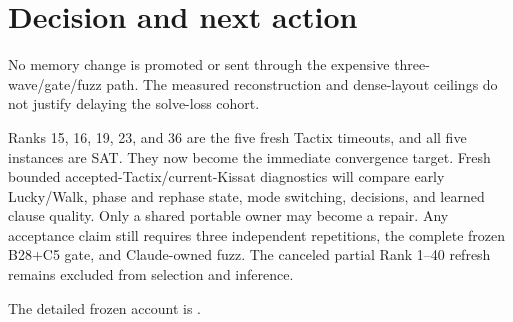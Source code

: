 \documentclass[11pt]{article}
\begin{document}
\section{Decision and next action}

No memory change is promoted or sent through the expensive three-wave/gate/fuzz
path.  The measured reconstruction and dense-layout ceilings do not justify
delaying the solve-loss cohort.

Ranks 15, 16, 19, 23, and 36 are the five fresh Tactix timeouts, and all five
instances are SAT.  They now become the immediate convergence target.  Fresh
bounded accepted-Tactix/current-Kissat diagnostics will compare early
Lucky/Walk, phase and rephase state, mode switching, decisions, and learned
clause quality.  Only a shared portable owner may become a repair.  Any
acceptance claim still requires three independent repetitions, the complete
frozen B28+C5 gate, and Claude-owned fuzz.  The canceled partial Rank 1--40
refresh remains excluded from selection and inference.

The detailed frozen account is
.
\end{document}
